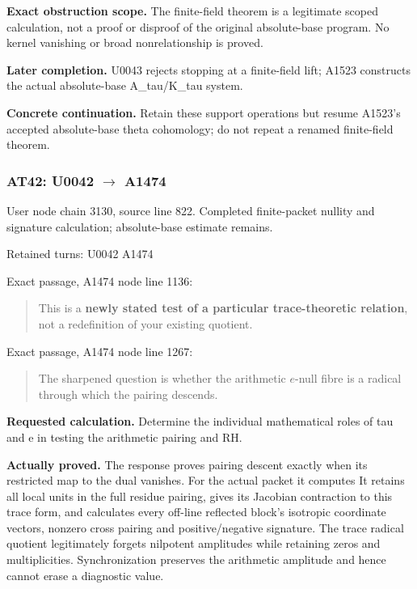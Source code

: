 \textbf{Exact obstruction scope.} The finite-field theorem is a
legitimate scoped calculation, not a proof or disproof of the original
absolute-base program. No kernel vanishing or broad nonrelationship is
proved.

\textbf{Later completion.} U0043 rejects stopping at a finite-field
lift; A1523 constructs the actual absolute-base A\_tau/K\_tau system.

\textbf{Concrete continuation.} Retain these support operations but
resume A1523's accepted absolute-base theta cohomology; do not repeat a
renamed finite-field theorem.

\subsubsection{\texorpdfstring{AT42: U0042
\allowbreak{}\ensuremath{→}\allowbreak{}
A1474}{AT42: U0042  A1474}}\label{at42-u0042-a1474}

User node \protect{} chain
3130, source line 822. Completed finite-packet nullity and signature
calculation; absolute-base estimate remains.

Retained turns: U0042
\protect{} A1474
\protect{}

Exact passage, A1474 node
\protect{} line 1136:

\begin{quote}
This is a \textbf{newly stated test of a particular trace-theoretic
relation}, not a redefinition of your existing quotient.
\end{quote}

Exact passage, A1474 node
\protect{} line 1267:

\begin{quote}
The sharpened question is whether the arithmetic \(e\)-null fibre is a
radical through which the pairing descends.
\end{quote}

\textbf{Requested calculation.} Determine the individual mathematical
roles of tau and e in testing the arithmetic pairing and RH.

\textbf{Actually proved.} The response proves pairing descent exactly
when its restricted map to the dual vanishes. For the actual packet it
computes  It retains all local units in the full residue pairing, gives its
Jacobian contraction to this trace form, and calculates every off-line
reflected block's isotropic coordinate vectors, nonzero cross pairing
and positive/negative signature. The trace radical quotient legitimately
forgets nilpotent amplitudes while retaining zeros and multiplicities.
Synchronization preserves the arithmetic amplitude and hence cannot
erase a diagnostic value.

